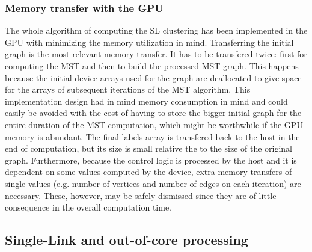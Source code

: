 \subsubsection{Memory transfer with the GPU}
The whole algorithm of computing the SL clustering has been implemented in the GPU with minimizing the memory utilization in mind.
Transferring the initial graph is the most relevant memory transfer.
It has to be transfered twice: first for computing the MST and then to build the processed MST graph.
This happens because the initial device arrays used for the graph are deallocated to give space for the arrays of subsequent iterations of the MST algorithm.
This implementation design had in mind memory consumption in mind and could easily be avoided with the cost of having to store the bigger initial graph for the entire duration of the MST computation, which might be worthwhile if the GPU memory is abundant.
The final labels array is transfered back to the host in the end of computation, but its size is small relative the to the size of the original graph.
Furthermore, because the control logic is processed by the host and it is dependent on some values computed by the device, extra memory transfers of single values (e.g. number of vertices and number of edges on each iteration) are necessary.
These, however, may be safely dismissed since they are of little consequence in the overall computation time.


\subsection{Single-Link and out-of-core processing}
\label{sec:sl disk}






